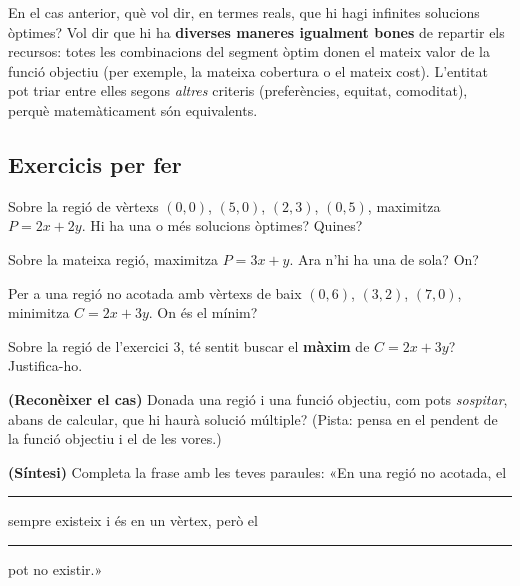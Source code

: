 \begin{exresolt}
En el cas anterior, què vol dir, en termes reals, que hi hagi infinites solucions
òptimes?
\solucio
Vol dir que hi ha \textbf{diverses maneres igualment bones} de repartir els recursos:
totes les combinacions del segment òptim donen el mateix valor de la funció objectiu
(per exemple, la mateixa cobertura o el mateix cost). L'entitat pot triar entre elles
segons \emph{altres} criteris (preferències, equitat, comoditat), perquè
matemàticament són equivalents.
\end{exresolt}

\subsection{Exercicis per fer}

\begin{exercicis}
\begin{exlist}
  \item Sobre la regió de vèrtexs $(0,0)$, $(5,0)$, $(2,3)$, $(0,5)$, maximitza
        $P=2x+2y$. Hi ha una o més solucions òptimes? Quines?
  \item Sobre la mateixa regió, maximitza $P=3x+y$. Ara n'hi ha una de sola? On?
  \item Per a una regió no acotada amb vèrtexs de baix $(0,6)$, $(3,2)$, $(7,0)$,
        minimitza $C=2x+3y$. On és el mínim?
  \item Sobre la regió de l'exercici 3, té sentit buscar el \textbf{màxim} de
        $C=2x+3y$? Justifica-ho.
  \item \textbf{(Reconèixer el cas)} Donada una regió i una funció objectiu, com pots
        \emph{sospitar}, abans de calcular, que hi haurà solució múltiple? (Pista:
        pensa en el pendent de la funció objectiu i el de les vores.)
  \item \textbf{(Síntesi)} Completa la frase amb les teves paraules: «En una regió no
        acotada, el \rule{1.5cm}{0.4pt} sempre existeix i és en un vèrtex, però el
        \rule{1.5cm}{0.4pt} pot no existir.»
\end{exlist}
\end{exercicis}

